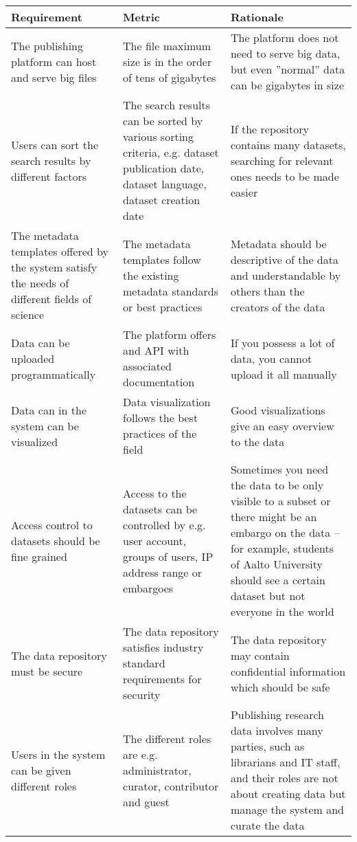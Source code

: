 \tabcolsep=0.11cm
\begin{tabularx}{\textwidth}{| >{\raggedright}p{3cm} | >{\raggedright}p{3cm} | X |}
    \hline
    \textbf{Requirement} & \textbf{Metric}& \textbf{Rationale} \\
    \hline
    \rowcolor{Gray}
    The publishing platform can host and serve big files    &The file maximum size is in the order of tens of gigabytes & The platform does not need to serve big data, but even ''normal'' data can be gigabytes in size\\
    \hline
    Users can sort the search results by different factors &The search results can be sorted by various sorting criteria, e.g. dataset publication date, dataset language, dataset creation date & If the repository contains many datasets, searching for relevant ones needs to be made easier\\
    \hline
    \rowcolor{Gray}
    The metadata templates offered by the system satisfy the needs of different fields of science    &The metadata templates follow the existing metadata standards or best practices & Metadata should be descriptive of the data and understandable by others than the creators of the data\\
    \hline
    Data can be uploaded programmatically  &The platform offers and API with associated documentation  & If you possess a lot of data, you cannot upload it all manually\\
    \hline
    \rowcolor{Gray}
    Data can in the system can be visualized        &Data visualization follows the best practices of the field  & Good visualizations give an easy overview to the data\\
    \hline
    Access control to datasets should be fine grained  & Access to the datasets can be controlled by e.g. user account, groups of users, IP address range or embargoes & Sometimes you need the data to be only visible to a subset or there might be an embargo on the data – for example, students of Aalto University should see a certain dataset but not everyone in the world\\
    \hline
    \rowcolor{Gray}
    The data repository must be secure   &The data repository satisfies industry standard requirements for security& The data repository may contain confidential information which should be safe\\
    \hline
    Users in the system can be given different roles &The different roles are e.g. administrator, curator, contributor and guest & Publishing research data involves many parties, such as librarians and IT staff, and their roles are not about creating data but manage the system and curate the data\\

\end{tabularx}

